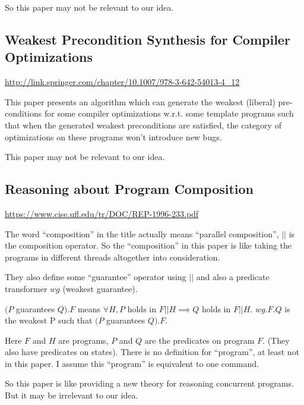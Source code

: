 \documentclass[12pt, fleqn]{article}
\begin{document}
So this paper may not be relevant to our idea.


\subsection{Weakest Precondition Synthesis for Compiler Optimizations}

\url{http://link.springer.com/chapter/10.1007/978-3-642-54013-4_12}

\bigskip

This paper presents an algorithm which can generate the weakest
(liberal) pre-conditions for some compiler optimizations w.r.t. some
template programs such that when the generated weakest preconditions
are satisfied, the category of optimizations on these programs won't
introduce new bugs.

This paper may not be relevant to our idea.


\subsection{Reasoning about Program Composition}

\url{https://www.cise.ufl.edu/tr/DOC/REP-1996-233.pdf}

\bigskip

The word ``composition'' in the title actually means ``parallel
composition'', $||$ is the composition operator. So the
``composition'' in this paper is like taking the programs in different
threads altogether into consideration.

They also define some ``guarantee'' operator using $||$ and also a
predicate transformer $wg$ (weakest guarantee).

$(P$ guarantees $Q).F$ means $\forall H, P$ holds in $F || H \implies
Q$ holds in $F || H$. $wg.F.Q$ is the weakest P such that $(P$
guarantees $Q).F$.

Here $F$ and $H$ are programs, $P$ and $Q$ are the predicates on
program $F$. (They also have predicates on states). There is no
definition for ``program'', at least not in this paper. I assume this
``program'' is equivalent to one command.

So this paper is like providing a new theory for reasoning concurrent
programs. But it may be irrelevant to our idea.

\end{document}
